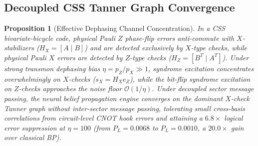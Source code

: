 \documentclass[journal]{IEEEtran}
\newtheorem{proposition}{Proposition}
\begin{document}
\subsection{Decoupled CSS Tanner Graph Convergence}
\begin{proposition}[Effective Dephasing Channel Concentration]
\label{prop:dephasing_concentration}
In a CSS bivariate-bicycle code, physical Pauli $Z$ phase-flip errors anti-commute with $X$-stabilizers ($H_X = [A \mid B]$) and are detected exclusively by $X$-type checks, while physical Pauli $X$ errors are detected by $Z$-type checks ($H_Z = [B^T \mid A^T]$). Under strong transmon dephasing bias $\eta = p_Z / p_X \gg 1$, syndrome excitation concentrates overwhelmingly on $X$-checks ($s_X = H_X e_Z$), while the bit-flip syndrome excitation on $Z$-checks approaches the noise floor $\mathcal{O}(1/\eta)$. Under decoupled sector message passing, the neural belief propagation engine converges on the dominant $X$-check Tanner graph without inter-sector message passing, tolerating small cross-basis correlations from circuit-level CNOT hook errors and attaining a $6.8\times$ logical error suppression at $\eta = 100$ (from $P_L = 0.0068$ to $P_L = 0.0010$, a $20.0\times$ gain over classical BP).
\end{proposition}
\end{document}
